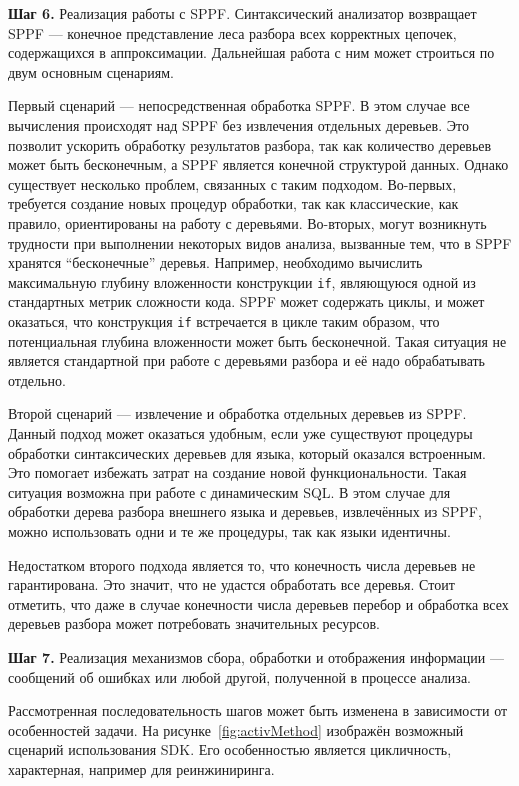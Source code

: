 \textbf{Шаг 6.} Реализация работы с SPPF. Синтаксический анализатор возвращает SPPF --- конечное представление леса разбора всех корректных цепочек, содержащихся в аппроксимации. Дальнейшая работа с ним может строиться по двум основным сценариям.

Первый сценарий --- непосредственная обработка SPPF. В этом случае все вычисления происходят над SPPF без извлечения отдельных деревьев. Это позволит ускорить обработку результатов разбора, так как количество деревьев может быть бесконечным, а SPPF является конечной структурой данных. Однако существует несколько проблем, связанных с таким подходом. Во-первых, требуется создание новых процедур обработки, так как классические, как правило, ориентированы на работу с деревьями. Во-вторых, могут возникнуть трудности при выполнении некоторых видов анализа, вызванные тем, что в SPPF хранятся ``бесконечные'' деревья. Например, необходимо вычислить максимальную глубину вложенности конструкции \verb|if|, являющуюся одной из стандартных метрик сложности кода. SPPF может содержать циклы, и может оказаться, что конструкция \verb|if| встречается в цикле таким образом, что потенциальная глубина вложенности может быть бесконечной. Такая ситуация не является стандартной при работе с деревьями разбора и её надо обрабатывать отдельно.

Второй сценарий --- извлечение и обработка отдельных деревьев из SPPF. Данный подход может оказаться удобным, если уже существуют процедуры обработки синтаксических деревьев для языка, который оказался встроенным. Это помогает избежать затрат на создание новой функциональности. Такая ситуация возможна при работе с динамическим SQL. В этом случае для обработки дерева разбора внешнего языка и деревьев, извлечённых из SPPF, можно использовать одни и те же процедуры, так как языки идентичны.

Недостатком второго подхода является то, что конечность числа деревьев не гарантирована. Это значит, что не удастся обработать все деревья. Стоит отметить, что даже в случае конечности числа деревьев перебор и обработка всех деревьев разбора может потребовать значительных ресурсов.


\textbf{Шаг 7.} Реализация механизмов сбора, обработки и отображения информации --- сообщений об ошибках или любой другой, полученной в процессе анализа.

Рассмотренная последовательность шагов может быть изменена в зависимости от особенностей задачи. На рисунке~\ref{fig:activMethod} изображён возможный сценарий использования SDK. Его особенностью является цикличность, характерная, например для реинжиниринга.

